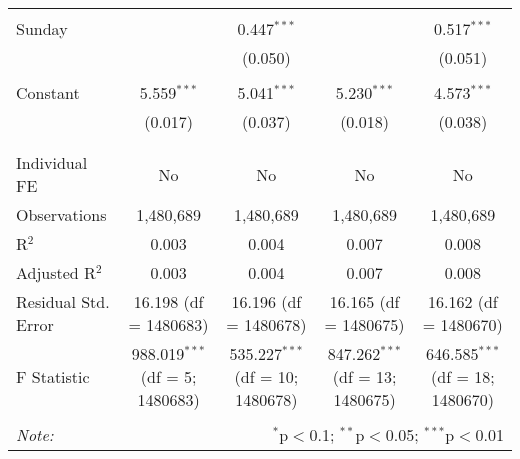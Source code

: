 \documentclass[
]{article}
\begin{document}
\begin{table}[!htbp]
{\begin{tabular}{@{\extracolsep{5pt}}lcccc}
  & & & & \\ 
 Sunday &  & 0.447$^{***}$ &  & 0.517$^{***}$ \\ 
  &  & (0.050) &  & (0.051) \\ 
  & & & & \\ 
 Constant & 5.559$^{***}$ & 5.041$^{***}$ & 5.230$^{***}$ & 4.573$^{***}$ \\ 
  & (0.017) & (0.037) & (0.018) & (0.038) \\ 
  & & & & \\ 
\hline \\[-1.8ex] 
Individual FE & No & No & No & No \\ 
Observations & 1,480,689 & 1,480,689 & 1,480,689 & 1,480,689 \\ 
R$^{2}$ & 0.003 & 0.004 & 0.007 & 0.008 \\ 
Adjusted R$^{2}$ & 0.003 & 0.004 & 0.007 & 0.008 \\ 
Residual Std. Error & 16.198 (df = 1480683) & 16.196 (df = 1480678) & 16.165 (df = 1480675) & 16.162 (df = 1480670) \\ 
F Statistic & 988.019$^{***}$ (df = 5; 1480683) & 535.227$^{***}$ (df = 10; 1480678) & 847.262$^{***}$ (df = 13; 1480675) & 646.585$^{***}$ (df = 18; 1480670) \\ 
\hline 
\hline \\[-1.8ex] 
\textit{Note:}  & \multicolumn{4}{r}{$^{*}$p$<$0.1; $^{**}$p$<$0.05; $^{***}$p$<$0.01} \\ 
\end{tabular}
} 
\end{table} 
\newpage
\end{document}
